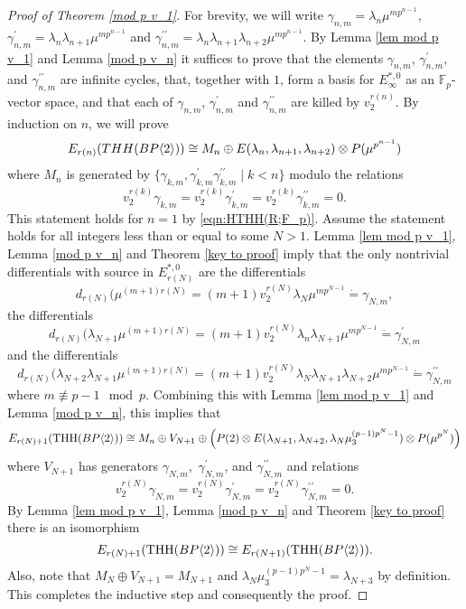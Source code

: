 \begin{proof}[Proof of Theorem \ref{mod p v_1}]
For brevity, we will write $\gamma_{n,m}=\lambda_n\mu^{mp^{n-1}}$, $\gamma_{n,m}^{\prime}=\lambda_n\lambda_{n+1}\mu^{mp^{n-1}}$ and $\gamma_{n,m}^{\prime\prime}=\lambda_n\lambda_{n+1}\lambda_{n+2}\mu^{mp^{n-1}}$. 
By Lemma \ref{lem mod p v_1} and Lemma \ref{mod p v_n} it suffices to prove that the elements $\gamma_{n,m}$, $\gamma_{n,m}^{\prime}$, and $\gamma_{n,m}^{\prime\prime}$ are infinite cycles, that, together with $1$, form a basis for $E_{\infty}^{*,0}$ as an $\mathbb{F}_p$-vector space, and that each of $\gamma_{n,m}$, $\gamma_{n,m}^{\prime}$ and $\gamma_{n,m}^{\prime\prime}$ are killed by $v_2^{r(n)}$. By induction on $n$, we will prove
\[ E_{r(n)}(THH(BP\langle 2 \rangle))\cong M_n\oplus E(\lambda_n,\lambda_{n+1},\lambda_{n+2})\otimes P(\mu^{p^{n-1}})\]
where $M_n$ is generated by $\{\gamma_{k,m}, \gamma_{k,m}^{\prime}\gamma_{k,m}^{\prime\prime}\mid k<n\}$ modulo the relations 
\[v_2^{r(k)}\gamma_{k,m}=v_2^{r(k)}\gamma_{k,m}^{\prime}=v_2^{r(k)}\gamma_{k,m}^{\prime\prime}=0. \]
This statement holds for $n=1$ by \eqref{eqn:HTHH(R;F_p)}. Assume the statement holds for all integers less than or equal to some $N>1$. Lemma \ref{lem mod p v_1}, Lemma \ref{mod p v_n} and Theorem \ref{key to proof} imply that the only nontrivial differentials with source in $E_{r(N)}^{*,0}$ are the differentials
\[ d_{r(N)}(\mu^{(m+1)r(N)}=(m+1)v_2^{r(N)}\lambda_N\mu^{mp^{N-1}}\dot{=}\gamma_{N,m},\]
the differentials 
\[ d_{r(N)}(\lambda_{N+1}\mu^{(m+1)r(N)}=(m+1)v_2^{r(N)}\lambda_n\lambda_{N+1}\mu^{mp^{N-1}}\dot{=}\gamma_{N,m}^{\prime}\]
and the differentials
\[ d_{r(N)}(\lambda_{N+2}\lambda_{N+1}\mu^{(m+1)r(N)}=(m+1)v_2^{r(N)}\lambda_N\lambda_{N+1}\lambda_{N+2}\mu^{mp^{N-1}}\dot{=}\gamma_{N,m}^{\prime \prime}\]
where $m\not \equiv p-1 \mod{p}$. Combining this with Lemma \ref{lem mod p v_1} and Lemma \ref{mod p v_n}, this implies that
\[ E_{r(N)+1}(\operatorname{THH}(BP\langle 2 \rangle))\cong M_n\oplus V_{N+1}\oplus \left ( P(2)\otimes E(\lambda_{N+1},\lambda_{N+2},\lambda_N\mu_3^{(p-1)p^N-1} )\otimes P(\mu^{p^N})\right )\]
where $V_{N+1}$ has generators $\gamma_{N,m},$ $\gamma_{N,m}^{\prime}$, and $\gamma_{N,m}^{\prime\prime}$ and relations 
\[ v_2^{r(N)}\gamma_{N,m}=v_2^{r(N)}\gamma_{N,m}^{\prime}=v_2^{r(N)}\gamma_{N,m}^{\prime\prime}=0.\]
By Lemma \ref{lem mod p v_1}, Lemma \ref{mod p v_n} and Theorem \ref{key to proof} there is an isomorphism
\[ E_{r(N)+1}(\operatorname{THH}(BP\langle 2 \rangle))\cong E_{r(N+1)}(\operatorname{THH}(BP\langle 2 \rangle)).\] 
Also, note that $M_N\oplus V_{N+1}=M_{N+1}$ and $\lambda_N\mu_3^{(p-1)p^N-1}=\lambda_{N+3}$ by definition. This completes the inductive step and consequently the proof.
\end{proof}



